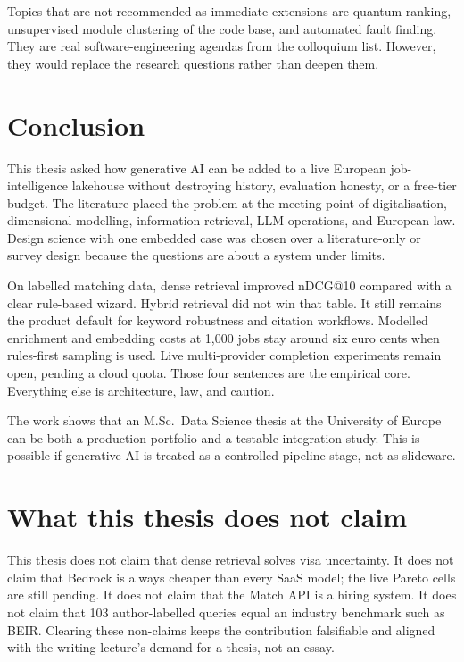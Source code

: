Topics that are not recommended as immediate extensions are quantum ranking, unsupervised module clustering of the code base, and automated fault finding. They are real software-engineering agendas from the colloquium list. However, they would replace the research questions rather than deepen them.

\section{Conclusion}
\label{sec:conclusion}

This thesis asked how generative AI can be added to a live European job-intelligence lakehouse without destroying history, evaluation honesty, or a free-tier budget. The literature placed the problem at the meeting point of digitalisation, dimensional modelling, information retrieval, LLM operations, and European law. Design science with one embedded case was chosen over a literature-only or survey design because the questions are about a system under limits.

On labelled matching data, dense retrieval improved nDCG@10 compared with a clear rule-based wizard. Hybrid retrieval did not win that table. It still remains the product default for keyword robustness and citation workflows. Modelled enrichment and embedding costs at 1{,}000 jobs stay around six euro cents when rules-first sampling is used. Live multi-provider completion experiments remain open, pending a cloud quota. Those four sentences are the empirical core. Everything else is architecture, law, and caution.

The work shows that an M.Sc.\ Data Science thesis at the University of Europe can be both a production portfolio and a testable integration study. This is possible if generative AI is treated as a controlled pipeline stage, not as slideware.

\section{What this thesis does not claim}
\label{sec:nonclaims}

This thesis does not claim that dense retrieval solves visa uncertainty. It does not claim that Bedrock is always cheaper than every SaaS model; the live Pareto cells are still pending. It does not claim that the Match API is a hiring system. It does not claim that 103 author-labelled queries equal an industry benchmark such as BEIR. Clearing these non-claims keeps the contribution falsifiable and aligned with the writing lecture's demand for a thesis, not an essay.

